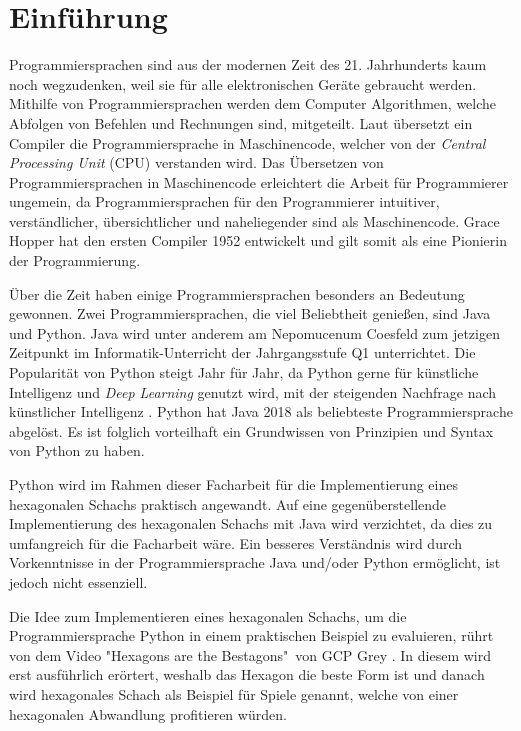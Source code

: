 \setcounter{page}{3}
\chapter{Einführung} %
Programmiersprachen sind aus der modernen Zeit des 21. Jahrhunderts kaum noch wegzudenken, weil sie für alle elektronischen Geräte gebraucht werden. Mithilfe von Programmiersprachen werden dem Computer Algorithmen, welche Abfolgen von Befehlen und Rechnungen sind, mitgeteilt\cite{Louis:2010}. Laut \cite{Louis:2010} übersetzt ein Compiler die Programmiersprache in Maschinencode, welcher von der \textit{Central Processing Unit} (CPU) verstanden wird. Das Übersetzen von Programmiersprachen in Maschinencode erleichtert die Arbeit für Programmierer ungemein, da Programmiersprachen für den Programmierer intuitiver, verständlicher, übersichtlicher und naheliegender sind als Maschinencode. Grace Hopper hat den ersten Compiler 1952 entwickelt und gilt somit als eine Pionierin der Programmierung.


\par %
Über die Zeit haben einige Programmiersprachen besonders an Bedeutung gewonnen. 
Zwei Programmiersprachen, die viel Beliebtheit genießen, sind Java und Python. 
Java wird unter anderem am Nepomucenum Coesfeld zum jetzigen Zeitpunkt im Informatik-Unterricht der Jahrgangsstufe Q1 unterrichtet. 
Die Popularität von Python steigt Jahr für Jahr, da Python gerne für künstliche Intelligenz und \textit{Deep Learning} genutzt wird, mit der steigenden Nachfrage nach künstlicher Intelligenz \cite{Github:PYPL}\cite{Gray:2017}. 
Python hat Java 2018 als beliebteste Programmiersprache abgelöst.
Es ist folglich vorteilhaft ein Grundwissen von Prinzipien und Syntax von Python zu haben. 

\par %
Python wird im Rahmen dieser Facharbeit für die Implementierung eines hexagonalen Schachs praktisch angewandt. 
Auf eine gegenüberstellende Implementierung des hexagonalen Schachs mit Java wird verzichtet, da dies zu umfangreich für die Facharbeit wäre. 
Ein besseres Verständnis wird durch Vorkenntnisse in der Programmiersprache Java und/oder Python ermöglicht, ist jedoch nicht essenziell. 

\par %
Die Idee zum Implementieren eines hexagonalen Schachs, um die Programmiersprache Python in einem praktischen Beispiel zu evaluieren, rührt von dem Video "Hexagons are the Bestagons"\ von GCP Grey \cite{Grey:Bestagons}. 
In diesem wird erst ausführlich erörtert, weshalb das Hexagon die beste Form ist und danach wird hexagonales Schach als Beispiel für Spiele genannt, welche von einer hexagonalen Abwandlung profitieren würden.
